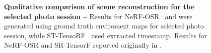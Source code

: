 \begin{figure}[!t]
  \centering
  \shadowsfigure
  \caption[Qualitative comparison of the scene reconstruction between \lumigauss and chosen baselines]{\textbf{Qualitative comparison of scene reconstruction for the selected photo session -- }
    Results for NeRF-OSR~\cite{rudnev2022nerfosr} and \lumigauss were generated
    using ground truth enviroment maps for selected photo session, while
    ST-TensoRF~\cite{chang2024srtensorf} used extracted timestamp.
    Results for NeRF-OSR and SR-TensorF reported originally in
    \cite{chang2024srtensorf}.
  }
  \label{fig:lumigauss-qual_gt_shadows}
\end{figure}